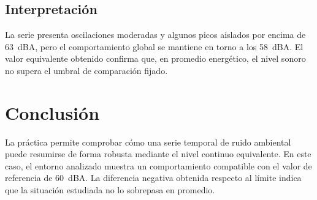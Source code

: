 \documentclass[12pt,a4paper]{article}
\begin{document}
\subsection*{Interpretación}
La serie presenta oscilaciones moderadas y algunos picos aislados por encima de \SI{63}{dBA}, pero el comportamiento global se mantiene en torno a los \SI{58}{dBA}. El valor equivalente obtenido confirma que, en promedio energético, el nivel sonoro no supera el umbral de comparación fijado.

\section*{Conclusión}
La práctica permite comprobar cómo una serie temporal de ruido ambiental puede resumirse de forma robusta mediante el nivel continuo equivalente. En este caso, el entorno analizado muestra un comportamiento compatible con el valor de referencia de \SI{60}{dBA}. La diferencia negativa obtenida respecto al límite indica que la situación estudiada no lo sobrepasa en promedio.
\end{document}
